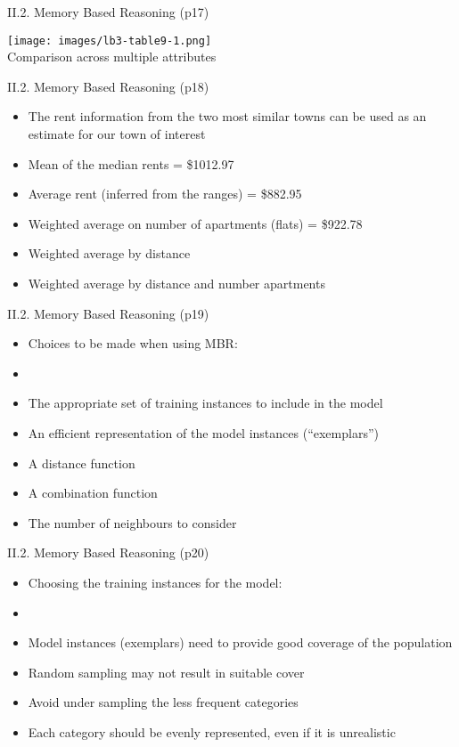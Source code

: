 \documentclass[handout]{beamer}
\begin{document}
\begin{frame}{II.2. Memory Based Reasoning (p17)}
\begin{center}
\texttt{[image: images/lb3-table9-1.png]}\\
Comparison across multiple attributes~\cite[Table 9.1]{LB3:2011}
\end{center}
\end{frame}
\begin{frame}{II.2. Memory Based Reasoning (p18)}
\begin{itemize}
\item The rent information from the two most similar towns can be used as an estimate for our town of interest
\item Mean of the median rents = \$1012.97
\item Average rent (inferred from the ranges) = \$882.95
\item Weighted average on number of apartments (flats) = \$922.78
\item Weighted average by distance
\item Weighted average by distance and number apartments
\end{itemize}
\end{frame}
\begin{frame}{II.2. Memory Based Reasoning (p19)}
\begin{itemize}
\item[] Choices to be made when using MBR:
\item[]
\item The appropriate set of training instances to include in the model
\item An efficient representation of the model instances (``exemplars'')
\item A distance function
\item A combination function
\item The number of neighbours to consider
\end{itemize}
\end{frame}
\begin{frame}{II.2. Memory Based Reasoning (p20)}
\begin{itemize}
\item[] Choosing the training instances for the model:
\item[]
\item Model instances (exemplars) need to provide good coverage of the population
\item Random sampling may not result in suitable cover
\item Avoid under sampling the less frequent categories 
\item Each category should be evenly represented, even if it is unrealistic
\end{itemize}
\end{frame}
\end{document}

